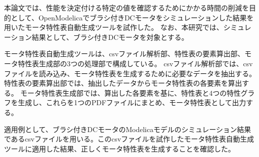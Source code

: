 





本論文では、性能を決定付ける特定の値を確認するためにかかる時間の削減を目的として、OpenModelicaでブラシ付きDCモータをシミュレーションした結果を用いたモータ特性表自動生成ツールを試作した。
なお、本研究では、シミュレーション結果として、ブラシ付きDCモータを対象とする。

モータ特性表自動生成ツールは、csvファイル解析部、特性表の要素算出部、モータ特性表生成部の3つの処理部で構成している。
csvファイル解析部では、csvファイルを読み込み、モータ特性表を生成するために必要なデータを抽出する。特性表の要素算出部では、抽出したデータからモータ特性表の各要素を算出する。
モータ特性表生成部では、算出した各要素を基に、特性表と4つの特性グラフを生成し、これらを1つのPDFファイルにまとめ、モータ特性表として出力する。

適用例として、ブラシ付きDCモータのModelicaモデルのシミュレーション結果であるcsvファイルを用いる。このcsvファイルを試作したモータ特性表自動生成ツールに適用した結果、正しくモータ特性表を生成することを確認した。


